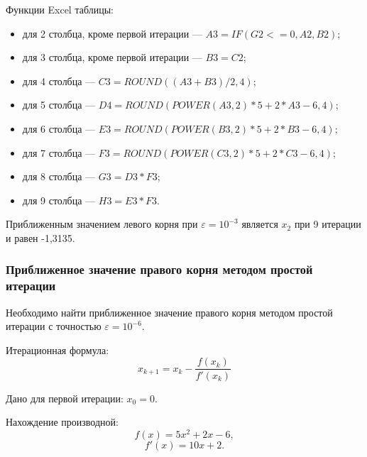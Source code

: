 \documentclass[10pt, a4paper, titlepage]{article}
\begin{document}
Функции Excel таблицы:
\begin{itemize}
    \item для 2 столбца, кроме первой итерации --- $A3=IF(G2<=0, A2, B2)$;
    
    \item для 3 столбца, кроме первой итерации --- $B3=C2$;
    
    \item для 4 столбца --- $C3=ROUND((A3+B3)/2, 4)$;
    
    \item для 5 столбца --- $D4=ROUND(POWER(A3, 2)*5+2*A3-6, 4)$;
    
    \item для 6 столбца --- $E3=ROUND(POWER(B3, 2)*5+2*B3-6, 4)$;
    
    \item для 7 столбца --- $F3=ROUND(POWER(C3, 2)*5+2*C3-6, 4)$;
    
    \item для 8 столбца --- $G3=D3*F3$;
    
    \item для 9 столбца --- $H3=E3*F3$.

\end{itemize}

Приближенным значением левого корня при $\varepsilon = 10^{-3}$ является $x_2$ при 9 итерации и равен -1,3135.

\subsubsection{Приближенное значение правого корня методом простой итерации}

Необходимо найти приближенное значение правого корня методом простой итерации с точностью $\varepsilon=10^{-6}$.

Итерационная формула: $$x_{k+1}=x_k-\frac{f(x_k)}{f'(x_k)}$$

Дано для первой итерации: $x_0=0$.

Нахождение производной:
$$f(x)=5x^2+2x-6,$$
$$f'(x)=10x+2.$$
\end{document}
